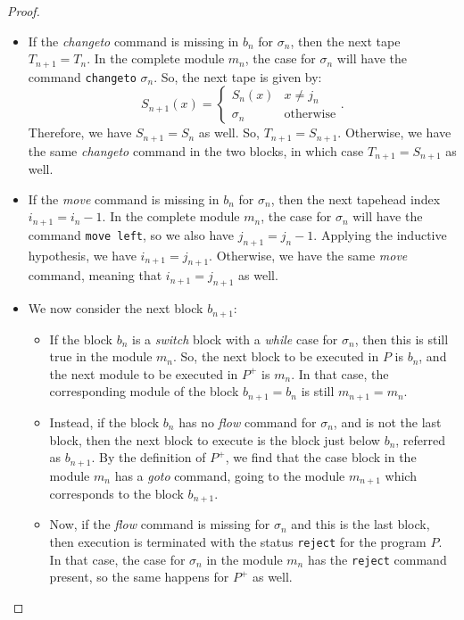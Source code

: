\begin{appendices}
\begin{proof}
\begin{itemize}
\begin{itemize}
            \item If the \textit{changeto} command is missing in $b_n$ for $\sigma_n$, then the next tape $T_{n+1} = T_n$. In the complete module $m_n$, the case for $\sigma_n$ will have the command \texttt{changeto} $\sigma_n$. So, the next tape is given by:
            \[S_{n+1}(x) = \begin{cases}
                S_n(x) & x \neq j_n \\
                \sigma_n & \text{otherwise}
            \end{cases}.\]
            Therefore, we have $S_{n+1} = S_n$ as well. So, $T_{n+1} = S_{n+1}$. Otherwise, we have the same \textit{changeto} command in the two blocks, in which case $T_{n+1} = S_{n+1}$ as well.
            
            \item If the \textit{move} command is missing in $b_n$ for $\sigma_n$, then the next tapehead index $i_{n+1} = i_n - 1$. In the complete module $m_n$, the case for $\sigma_n$ will have the command \texttt{move left}, so we also have $j_{n+1} = j_n - 1$. Applying the inductive hypothesis, we have $i_{n+1} = j_{n+1}$. Otherwise, we have the same \textit{move} command, meaning that $i_{n+1} = j_{n+1}$ as well.
            
            \item We now consider the next block $b_{n+1}$:
            \begin{itemize}
                \item If the block $b_n$ is a \textit{switch} block with a \textit{while} case for $\sigma_n$, then this is still true in the module $m_n$. So, the next block to be executed in $P$ is $b_n$, and the next module to be executed in $P^+$ is $m_n$. In that case, the corresponding module of the block $b_{n+1} = b_n$ is still $m_{n+1} = m_n$.
    
                \item Instead, if the block $b_n$ has no \textit{flow} command for $\sigma_n$, and is not the last block, then the next block to execute is the block just below $b_n$, referred as $b_{n+1}$. By the definition of $P^+$, we find that the case block in the module $m_n$ has a \textit{goto} command, going to the module $m_{n+1}$ which corresponds to the block $b_{n+1}$. 
            
                \item Now, if the \textit{flow} command is missing for $\sigma_n$ and this is the last block, then execution is terminated with the status \texttt{reject} for the program $P$. In that case, the case for $\sigma_n$ in the module $m_n$ has the \texttt{reject} command present, so the same happens for $P^+$ as well. 
            

\end{itemize}
\end{itemize}
\end{itemize}
\end{proof}
\end{appendices}
